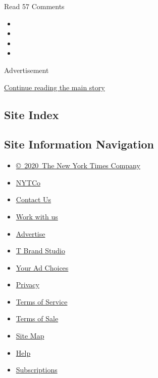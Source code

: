 Read 57 Comments

\begin{itemize}
\item
\item
\item
\item
\end{itemize}

Advertisement

\protect\hyperlink{after-bottom}{Continue reading the main story}

\hypertarget{site-index}{%
\subsection{Site Index}\label{site-index}}

\hypertarget{site-information-navigation}{%
\subsection{Site Information
Navigation}\label{site-information-navigation}}

\begin{itemize}
\tightlist
\item
  \href{https://help.nytimes3xbfgragh.onion/hc/en-us/articles/115014792127-Copyright-notice}{©~2020~The
  New York Times Company}
\end{itemize}

\begin{itemize}
\tightlist
\item
  \href{https://www.nytco.com/}{NYTCo}
\item
  \href{https://help.nytimes3xbfgragh.onion/hc/en-us/articles/115015385887-Contact-Us}{Contact
  Us}
\item
  \href{https://www.nytco.com/careers/}{Work with us}
\item
  \href{https://nytmediakit.com/}{Advertise}
\item
  \href{http://www.tbrandstudio.com/}{T Brand Studio}
\item
  \href{https://www.nytimes3xbfgragh.onion/privacy/cookie-policy\#how-do-i-manage-trackers}{Your
  Ad Choices}
\item
  \href{https://www.nytimes3xbfgragh.onion/privacy}{Privacy}
\item
  \href{https://help.nytimes3xbfgragh.onion/hc/en-us/articles/115014893428-Terms-of-service}{Terms
  of Service}
\item
  \href{https://help.nytimes3xbfgragh.onion/hc/en-us/articles/115014893968-Terms-of-sale}{Terms
  of Sale}
\item
  \href{https://spiderbites.nytimes3xbfgragh.onion}{Site Map}
\item
  \href{https://help.nytimes3xbfgragh.onion/hc/en-us}{Help}
\item
  \href{https://www.nytimes3xbfgragh.onion/subscription?campaignId=37WXW}{Subscriptions}
\end{itemize}
